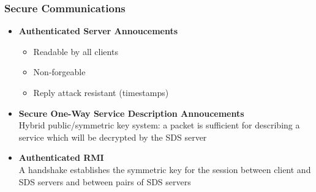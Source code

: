 \documentclass{beamer}
\begin{document}
\begin{frame}
\frametitle{Secure Communications}
\begin{itemize}[<+->]
\item {\bf Authenticated Server Annoucements}
\begin{itemize}
\item Readable by all clients
\item Non-forgeable 
\item Reply attack resistant (timestamps)
\end{itemize}
\item {\bf Secure One-Way Service Description Annoucements}\\
Hybrid public/symmetric key system: a packet is sufficient for describing a service which will be decrypted by the SDS server
\item {\bf Authenticated RMI}\\
A handshake establishes the symmetric key for the session between client and SDS servers and between pairs of SDS servers
\end{itemize}
\end{frame}

\end{document}
